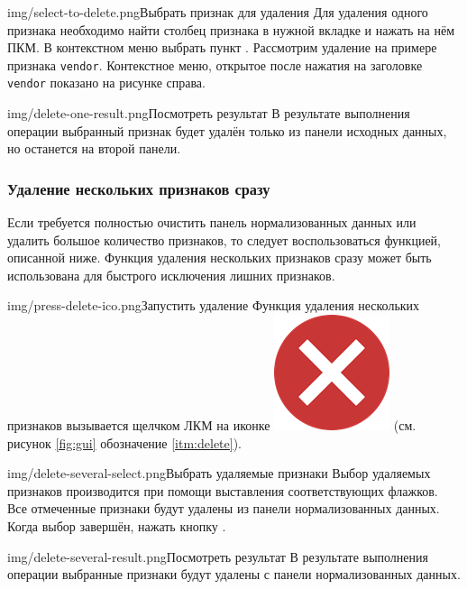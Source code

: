 \documentclass[12pt,tikz]{instruction}
\begin{document}
\begin{steps}
	\begin{ist}{img/select-to-delete.png}{Выбрать признак для удаления}
		Для удаления одного признака необходимо найти столбец признака в нужной вкладке и нажать на нём ПКМ. В контекстном меню выбрать пункт . Рассмотрим удаление на примере признака \texttt{vendor}. Контекстное меню, открытое после нажатия на заголовке \texttt{vendor} показано на рисунке справа.
	\end{ist}
	\begin{ist}{img/delete-one-result.png}{Посмотреть результат}
		В результате выполнения операции выбранный признак будет удалён только из панели исходных данных, но останется на второй панели.
	\end{ist}		
\end{steps}

\newpage
\subsubsection{Удаление нескольких признаков сразу}

Если требуется полностью очистить панель нормализованных данных или удалить большое количество признаков, то следует воспользоваться функцией, описанной ниже. Функция удаления нескольких признаков сразу может быть использована для быстрого исключения лишних признаков.

\begin{steps}
	\begin{ist}{img/press-delete-ico.png}{Запустить удаление}
		Функция удаления нескольких признаков вызывается щелчком ЛКМ на иконке \includegraphics[scale=0.1]{img/delete.png} (см. рисунок \ref{fig:gui} обозначение \ref{itm:delete}).
	\end{ist}
	\begin{ist}{img/delete-several-select.png}{Выбрать удаляемые признаки}
		Выбор удаляемых признаков производится при помощи выставления соответствующих флажков. Все отмеченные признаки будут удалены из панели нормализованных данных. Когда выбор завершён, нажать кнопку .
	\end{ist}	
	\begin{ist}{img/delete-several-result.png}{Посмотреть результат}
		В результате выполнения операции выбранные признаки будут удалены с панели нормализованных данных.
	\end{ist}	
		
\end{steps}
\end{document}
